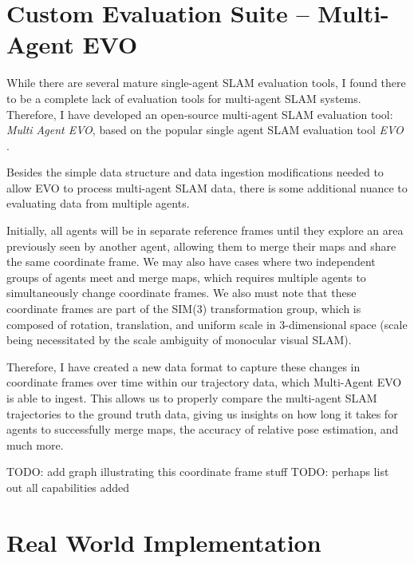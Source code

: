 \section{Custom Evaluation Suite – Multi-Agent EVO}
\label{sec:multi-agent-evo}
While there are several mature single-agent SLAM evaluation tools, I found there to be a complete lack of evaluation tools for multi-agent SLAM systems. Therefore, I have developed an open-source multi-agent SLAM evaluation tool: \textit{Multi Agent EVO}, based on the popular single agent SLAM evaluation tool \textit{EVO} \autocite{grupp2017evo}.

Besides the simple data structure and data ingestion modifications needed to allow EVO to process multi-agent SLAM data, there is some additional nuance to evaluating data from multiple agents.

Initially, all agents will be in separate reference frames until they explore an area previously seen by another agent, allowing them to merge their maps and share the same coordinate frame. We may also have cases where two independent groups of agents meet and merge maps, which requires multiple agents to simultaneously change coordinate frames. We also must note that these coordinate frames are part of the SIM(3) transformation group, which is composed of rotation, translation, and uniform scale in 3-dimensional space (scale being necessitated by the scale ambiguity of monocular visual SLAM).

Therefore, I have created a new data format to capture these changes in coordinate frames over time within our trajectory data, which Multi-Agent EVO is able to ingest. This allows us to properly compare the multi-agent SLAM trajectories to the ground truth data, giving us insights on how long it takes for agents to successfully merge maps, the accuracy of relative pose estimation, and much more.

TODO: add graph illustrating this coordinate frame stuff
TODO: perhaps list out all capabilities added

\section{Real World Implementation}
\label{sec:real-world-implementation}





